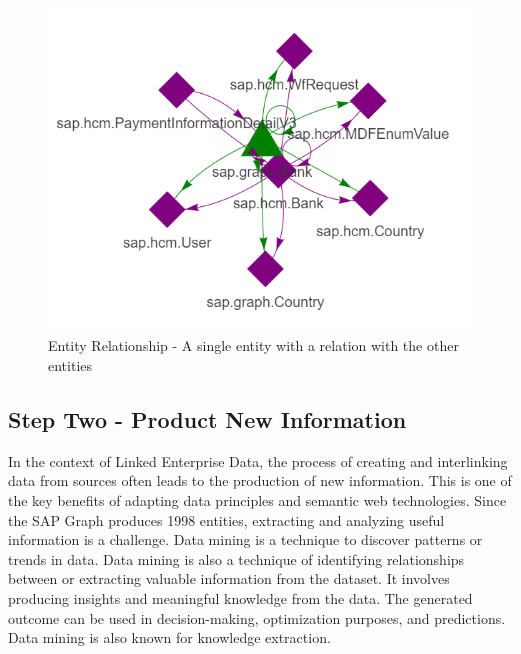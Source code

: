\documentclass{article}
\begin{document}
\begin{figure}[ht!]
    \centering
    \includegraphics[scale=0.6]{graph-open-data}
    \caption{Entity Relationship - 
A single entity with a relation with the other entities}
    \label{fig:graph-open-data}
\end{figure}


\maketitle
\subsection{Step Two - Product New Information}
In the context of Linked Enterprise Data, the process of creating and interlinking data from sources often leads to the production of new information. This is one of the key benefits of adapting data principles and semantic web technologies. Since the SAP Graph produces 1998 entities, extracting and analyzing useful information is a challenge. Data mining is a technique to discover patterns or trends in data. Data mining is also a technique of identifying relationships between or extracting valuable information from the dataset. It involves producing insights and meaningful knowledge from the data. The generated outcome can be used in decision-making, optimization purposes, and predictions. Data mining is also known for knowledge extraction. \parencite{chen1996}
\end{document}
